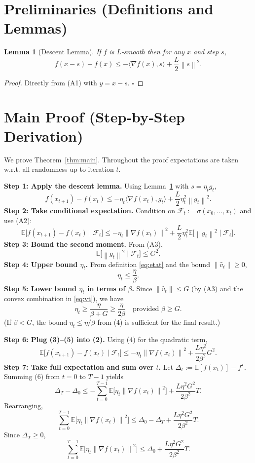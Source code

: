 \documentclass{article}
\newtheorem{lemma}{Lemma}
\newcommand{\EE}{\mathbb{E}}
\newcommand{\norm}[1]{\left\lVert#1\right\rVert}
\begin{document}
\newpage
\section*{Preliminaries (Definitions and Lemmas)}
\begin{lemma}[Descent Lemma]
\label{lem:descent}
If $f$ is $L$‑smooth then for any $x$ and step $s$,
\[
f(x-s)-f(x)\le -\langle\nabla f(x),s\rangle+\frac{L}{2}\norm{s}^2 .
\]
\end{lemma}
\begin{proof}
Directly from (A1) with $y=x-s$. \hfill $\square$
\end{proof}

\section*{Main Proof (Step‑by‑Step Derivation)}
We prove Theorem~\ref{thm:main}. Throughout the proof expectations are taken w.r.t. all randomness up to iteration $t$.

\medskip
\noindent\textbf{Step 1: Apply the descent lemma.}  
Using Lemma~\ref{lem:descent} with $s=\eta_t g_t$,
\[
f(x_{t+1})-f(x_t)
\le -\eta_t\langle\nabla f(x_t),g_t\rangle
+\frac{L}{2}\eta_t^2\norm{g_t}^2 .
\tag{1}
\]
\noindent\textbf{Step 2: Take conditional expectation.}  
Condition on $\mathcal{F}_t:=\sigma(x_0,\dots,x_t)$ and use (A2):
\[
\EE\!\bigl[f(x_{t+1})-f(x_t)\mid\mathcal{F}_t\bigr]
\le -\eta_t\norm{\nabla f(x_t)}^2
+\frac{L}{2}\eta_t^2\EE\!\bigl[\norm{g_t}^2\mid\mathcal{F}_t\bigr].
\tag{2}
\]
\noindent\textbf{Step 3: Bound the second moment.}  
From (A3),
\[
\EE\!\bigl[\norm{g_t}^2\mid\mathcal{F}_t\bigr]\le G^2 .
\tag{3}
\]
\noindent\textbf{Step 4: Upper bound $\eta_t$.}  
From definition \eqref{eq:etat} and the bound $\norm{\hat v_t}\ge0$,
\[
\eta_t\le \frac{\eta}{\beta}.
\tag{4}
\]
\noindent\textbf{Step 5: Lower bound $\eta_t$ in terms of $\beta$.}  
Since $\norm{\hat v_t}\le G$ (by (A3) and the convex combination in \eqref{eq:vt}), we have
\[
\eta_t\ge \frac{\eta}{\beta+G}\ge \frac{\eta}{2\beta}\quad\text{provided }\beta\ge G.
\tag{5}
\]
(If $\beta<G$, the bound $\eta_t\le\eta/\beta$ from (4) is sufficient for the final result.)

\noindent\textbf{Step 6: Plug (3)–(5) into (2).}  
Using (4) for the quadratic term,
\[
\EE\!\bigl[f(x_{t+1})-f(x_t)\mid\mathcal{F}_t\bigr]
\le -\eta_t\norm{\nabla f(x_t)}^2
+\frac{L\eta^2}{2\beta^2}G^2 .
\tag{6}
\]
\noindent\textbf{Step 7: Take full expectation and sum over $t$.}  
Let $\Delta_t:=\EE[f(x_t)]-f^\star$. Summing (6) from $t=0$ to $T-1$ yields
\[
\Delta_T-\Delta_0
\le -\sum_{t=0}^{T-1}\EE\!\bigl[\eta_t\norm{\nabla f(x_t)}^2\bigr]
+\frac{L\eta^2 G^2}{2\beta^2}T .
\tag{7}
\]
Rearranging,
\[
\sum_{t=0}^{T-1}\EE\!\bigl[\eta_t\norm{\nabla f(x_t)}^2\bigr]
\le \Delta_0-\Delta_T+\frac{L\eta^2 G^2}{2\beta^2}T .
\tag{8}
\]
Since $\Delta_T\ge0$,
\[
\sum_{t=0}^{T-1}\EE\!\bigl[\eta_t\norm{\nabla f(x_t)}^2\bigr]
\le \Delta_0+\frac{L\eta^2 G^2}{2\beta^2}T .
\tag{9}
\]
\end{document}

